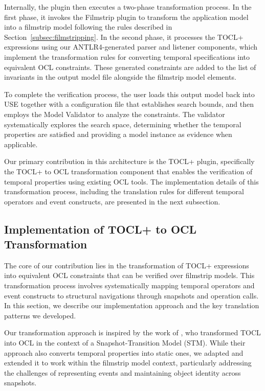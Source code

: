 Internally, the plugin then executes a two-phase transformation process. In the first phase, it invokes the Filmstrip plugin to transform the application model into a filmstrip model following the rules described in Section~\ref{subsec:filmstripping}. In the second phase, it processes the TOCL+ expressions using our ANTLR4-generated parser and listener components, which implement the transformation rules for converting temporal specifications into equivalent OCL constraints. These generated constraints are added to the list of invariants in the output model file alongside the filmstrip model elements.

To complete the verification process, the user loads this output model back into USE together with a configuration file that establishes search bounds, and then employs the Model Validator to analyze the constraints. The validator systematically explores the search space, determining whether the temporal properties are satisfied and providing a model instance as evidence when applicable.

Our primary contribution in this architecture is the TOCL+ plugin, specifically the TOCL+ to OCL transformation component that enables the verification of temporal properties using existing OCL tools. The implementation details of this transformation process, including the translation rules for different temporal operators and event constructs, are presented in the next subsection.


\subsection{Implementation of TOCL+ to OCL Transformation}

\hspace{1cm} The core of our contribution lies in the transformation of TOCL+ 
expressions into equivalent OCL constraints that can be verified over filmstrip 
models. This transformation process involves systematically mapping temporal operators 
and event constructs to structural navigations through snapshots and operation calls. 
In this section, we describe our implementation approach and the key translation 
patterns we developed.

Our transformation approach is inspired by the work of \cite{TOCL2OCL}, who 
transformed TOCL \cite{TOCL} into OCL in the context of a Snapshot-Transition Model 
(STM). While their approach also converts temporal properties into static ones, we 
adapted and extended it to work within the filmstrip model context, particularly 
addressing the challenges of representing events and maintaining object identity 
across snapshots.

